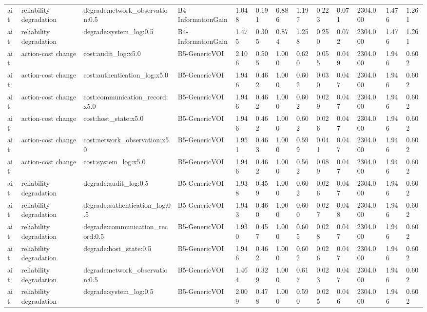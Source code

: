 \begin{table}[!ht]
{\begin{tabular}{lllllllllllll}
ait & reliability degradation & degrade:network\_observation:0.5 & B4-InformationGain & 1.048 & 0.191 & 0.886 & 1.197 & 0.223 & 0.071 & 2304.000 & 1.476 & 1.261 \\
ait & reliability degradation & degrade:system\_log:0.5 & B4-InformationGain & 1.475 & 0.305 & 0.874 & 1.258 & 0.250 & 0.072 & 2304.000 & 1.476 & 1.261 \\
ait & action-cost change & cost:audit\_log:x5.0 & B5-GenericVOI & 2.106 & 0.505 & 1.000 & 0.620 & 0.055 & 0.049 & 2304.000 & 1.946 & 0.602 \\
ait & action-cost change & cost:authentication\_log:x5.0 & B5-GenericVOI & 1.946 & 0.462 & 1.000 & 0.602 & 0.030 & 0.047 & 2304.000 & 1.946 & 0.602 \\
ait & action-cost change & cost:communication\_record:x5.0 & B5-GenericVOI & 1.946 & 0.462 & 1.000 & 0.602 & 0.029 & 0.047 & 2304.000 & 1.946 & 0.602 \\
ait & action-cost change & cost:host\_state:x5.0 & B5-GenericVOI & 1.946 & 0.462 & 1.000 & 0.602 & 0.026 & 0.047 & 2304.000 & 1.946 & 0.602 \\
ait & action-cost change & cost:network\_observation:x5.0 & B5-GenericVOI & 1.951 & 0.463 & 1.000 & 0.599 & 0.041 & 0.047 & 2304.000 & 1.946 & 0.602 \\
ait & action-cost change & cost:system\_log:x5.0 & B5-GenericVOI & 1.946 & 0.462 & 1.000 & 0.562 & 0.089 & 0.047 & 2304.000 & 1.946 & 0.602 \\
ait & reliability degradation & degrade:audit\_log:0.5 & B5-GenericVOI & 1.938 & 0.459 & 1.000 & 0.602 & 0.026 & 0.047 & 2304.000 & 1.946 & 0.602 \\
ait & reliability degradation & degrade:authentication\_log:0.5 & B5-GenericVOI & 1.943 & 0.460 & 1.000 & 0.600 & 0.027 & 0.048 & 2304.000 & 1.946 & 0.602 \\
ait & reliability degradation & degrade:communication\_record:0.5 & B5-GenericVOI & 1.930 & 0.457 & 1.000 & 0.605 & 0.028 & 0.047 & 2304.000 & 1.946 & 0.602 \\
ait & reliability degradation & degrade:host\_state:0.5 & B5-GenericVOI & 1.946 & 0.462 & 1.000 & 0.602 & 0.026 & 0.047 & 2304.000 & 1.946 & 0.602 \\
ait & reliability degradation & degrade:network\_observation:0.5 & B5-GenericVOI & 1.464 & 0.329 & 1.000 & 0.617 & 0.023 & 0.047 & 2304.000 & 1.946 & 0.602 \\
ait & reliability degradation & degrade:system\_log:0.5 & B5-GenericVOI & 2.009 & 0.478 & 1.000 & 0.590 & 0.025 & 0.046 & 2304.000 & 1.946 & 0.602 \\

\end{tabular}}
\end{table}
